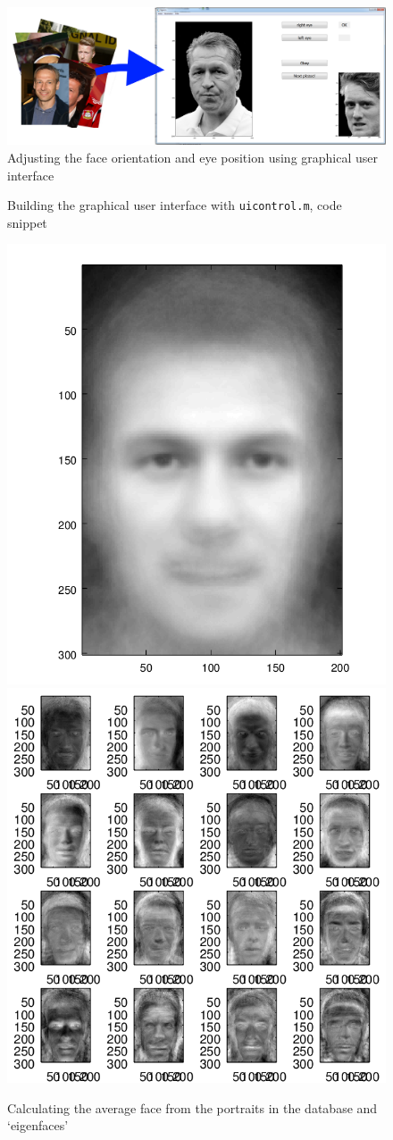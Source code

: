 \documentclass{beamer}
\begin{document}
\begin{frame}[t]{}
\begin{multicols}{5}
\begin{figure}
\includegraphics[width=0.95\hsize]{GUIalles.png} %
\caption{Adjusting the face orientation and eye position using graphical user interface}
\end{figure}

\begin{figure}
\caption{Building the graphical user interface with \texttt{uicontrol.m}, code snippet
        }
\end{figure}


\begin{figure}
\includegraphics[height=0.53\hsize]{avrgface.png} \hfill
\includegraphics[height=0.53\hsize]{eigenfaces.png}
\caption{Calculating the average face from the portraits in the database and `eigenfaces'}
\end{figure}


\end{multicols}
\end{frame}
\end{document}
